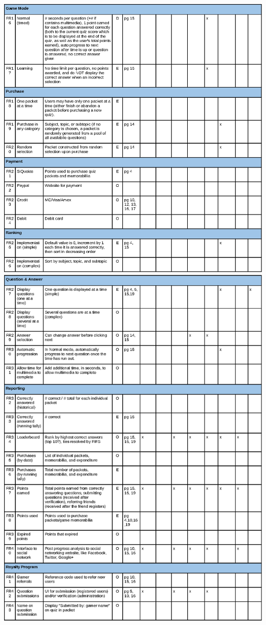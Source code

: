 \documentclass[12pt]{article}
\begin{document}
\begin{center}
\newpage
\includegraphics[width=\textwidth]{trace2}
\newpage
\includegraphics[width=\textwidth]{trace3}

\end{center}
\end{document}
